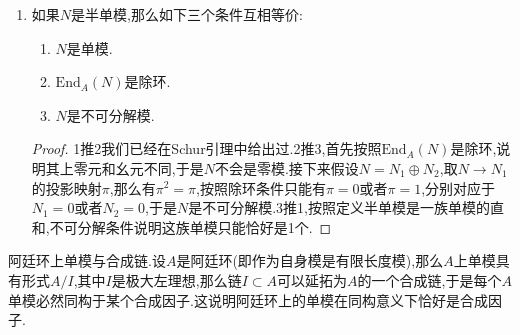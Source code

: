 \begin{enumerate}
\begin{enumerate}
\begin{proof}
			$\varphi$可视为$k$模$M$上的自同态.按照维数有限,并且$k$是代数闭的,于是可取一个特征值$\lambda\in k$,考虑映射$\varphi-\lambda\mathrm{id}_M$,它也是$A$模$M$上的自同态并且不可逆,于是上一条说明它只能是零映射,于是$\varphi=\lambda\mathrm{id}_M$.
		\end{proof}
	\end{enumerate}
	\item 如果$N$是半单模,那么如下三个条件互相等价:
	\begin{enumerate}
		\item $N$是单模.
		\item $\mathrm{End}_A(N)$是除环.
		\item $N$是不可分解模.
	\end{enumerate}
	\begin{proof}
		
		1推2我们已经在Schur引理中给出过.2推3,首先按照$\mathrm{End}_A(N)$是除环,说明其上零元和幺元不同,于是$N$不会是零模.接下来假设$N=N_1\oplus N_2$,取$N\to N_1$的投影映射$\pi$,那么有$\pi^2=\pi$,按照除环条件只能有$\pi=0$或者$\pi=1$,分别对应于$N_1=0$或者$N_2=0$,于是$N$是不可分解模.3推1,按照定义半单模是一族单模的直和,不可分解条件说明这族单模只能恰好是1个.
	\end{proof}
\end{enumerate}

阿廷环上单模与合成链.设$A$是阿廷环(即作为自身模是有限长度模),那么$A$上单模具有形式$A/I$,其中$I$是极大左理想,那么链$I\subset A$可以延拓为$A$的一个合成链,于是每个$A$单模必然同构于某个合成因子.这说明阿廷环上的单模在同构意义下恰好是合成因子.


